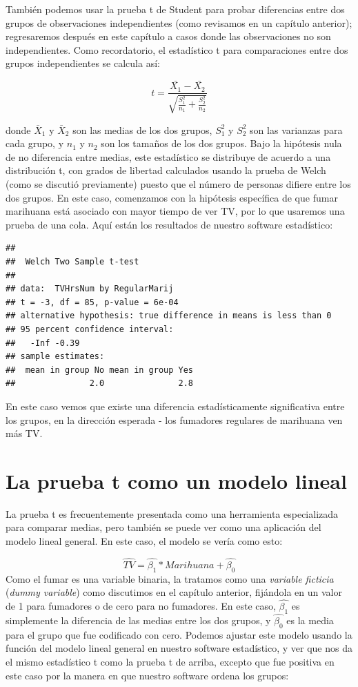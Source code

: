 \documentclass[
  12pt,
]{book}
\begin{document}
También podemos usar la prueba t de Student para probar diferencias entre dos grupos de observaciones independientes (como revisamos en un capítulo anterior); regresaremos después en este capítulo a casos donde las observaciones no son independientes. Como recordatorio, el estadístico t para comparaciones entre dos grupos independientes se calcula así:

\[
t = \frac{\bar{X_1} - \bar{X_2}}{\sqrt{\frac{S_1^2}{n_1} + \frac{S_2^2}{n_2}}}
\]

donde \(\bar{X}_1\) y \(\bar{X}_2\) son las medias de los dos grupos, \(S^2_1\) y \(S^2_2\) son las varianzas para cada grupo, y \(n_1\) y \(n_2\) son los tamaños de los dos grupos. Bajo la hipótesis nula de no diferencia entre medias, este estadístico se distribuye de acuerdo a una distribución t, con grados de libertad calculados usando la prueba de Welch (como se discutió previamente) puesto que el número de personas difiere entre los dos grupos. En este caso, comenzamos con la hipótesis específica de que fumar marihuana está asociado con mayor tiempo de ver TV, por lo que usaremos una prueba de una cola. Aquí están los resultados de nuestro software estadístico:

\begin{verbatim}
## 
##  Welch Two Sample t-test
## 
## data:  TVHrsNum by RegularMarij
## t = -3, df = 85, p-value = 6e-04
## alternative hypothesis: true difference in means is less than 0
## 95 percent confidence interval:
##   -Inf -0.39
## sample estimates:
##  mean in group No mean in group Yes 
##               2.0               2.8
\end{verbatim}

En este caso vemos que existe una diferencia estadísticamente significativa entre los grupos, en la dirección esperada - los fumadores regulares de marihuana ven más TV.

\hypertarget{ttest-linear-model}{%
\section{La prueba t como un modelo lineal}\label{ttest-linear-model}}

La prueba t es frecuentemente presentada como una herramienta especializada para comparar medias, pero también se puede ver como una aplicación del modelo lineal general. En este caso, el modelo se vería como esto:

\[
\hat{TV} = \hat{\beta_1}*Marihuana + \hat{\beta_0}
\]
Como el fumar es una variable binaria, la tratamos como una \emph{variable ficticia} (\emph{dummy variable}) como discutimos en el capítulo anterior, fijándola en un valor de 1 para fumadores o de cero para no fumadores. En este caso, \(\hat{\beta_1}\) es simplemente la diferencia de las medias entre los dos grupos, y \(\hat{\beta_0}\) es la media para el grupo que fue codificado con cero. Podemos ajustar este modelo usando la función del modelo lineal general en nuestro software estadístico, y ver que nos da el mismo estadístico t como la prueba t de arriba, excepto que fue positiva en este caso por la manera en que nuestro software ordena los grupos:
\end{document}
